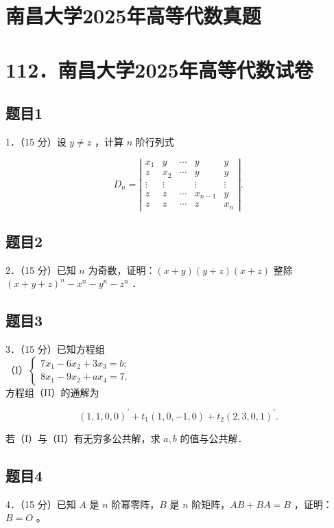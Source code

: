 \documentclass{article}
\begin{document}
\section*{南昌大学2025年高等代数真题}
\section*{112．南昌大学2025年高等代数试卷}

\subsection{题目1}
1．（15 分）设 \(y \neq z\) ，计算 \(n\) 阶行列式

\[
D_{n}=\left|\begin{array}{ccccc}
x_{1} & y & \cdots & y & y \\
z & x_{2} & \cdots & y & y \\
\vdots & \vdots & & \vdots & \vdots \\
z & z & \cdots & x_{n-1} & y \\
z & z & \cdots & z & x_{n}
\end{array}\right| .
\]

\subsection{题目2}
2．（15 分）已知 \(n\) 为奇数，证明：\((x+y)(y+z)(x+z)\) 整除 \((x+y+z)^{n}-x^{n}-y^{n}-z^{n}\) ．

\subsection{题目3}
3．（15 分）已知方程组\\
（I）\(\left\{\begin{array}{l}7 x_{1}-6 x_{2}+3 x_{3}=b ; \\ 8 x_{1}-9 x_{2}+a x_{4}=7 .\end{array}\right.\)\\
方程组（II）的通解为

\[
(1,1,0,0)^{\prime}+t_{1}(1,0,-1,0)+t_{2}(2,3,0,1)^{\prime} .
\]

若（I）与（II）有无穷多公共解，求 \(a, b\) 的值与公共解．

\subsection{题目4}
4．（15 分）已知 \(A\) 是 \(n\) 阶幂零阵，\(B\) 是 \(n\) 阶矩阵，\(A B+B A=B\) ，证明：\(B=O\) 。
\end{document}
